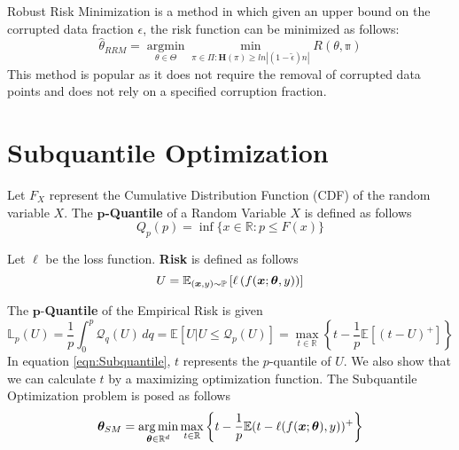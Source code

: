 \documentclass{article} %
\begin{document}
	Robust Risk Minimization \cite{RRM} is a method in which given an upper bound on the corrupted data fraction $\epsilon$, the risk function can be minimized as follows:
	\begin{equation}
		\hat{\mathbb{\theta}}_{RRM} = \operatorname*{argmin}_{\theta \in \Theta} \operatorname*{min}_{\pi \in \Pi: \mathbf{H}(\pi) \geq ln|(1-\tilde{\epsilon})n|} R(\mathbb{\theta,\pi})
	\end{equation}
	This method is popular as it does not require the removal of corrupted data points and does not rely on a specified corruption fraction.
		
	\section{Subquantile Optimization}
	\label{sec:Subquantile-optimization}
	
	\begin{definition}
		Let $F_X$ represent the Cumulative Distribution Function (CDF) of the random variable $X$. The \textbf{$\mathbf{p}$-Quantile} of a Random Variable $X$ is defined as follows \vspace{1em}
		\begin{equation}
			Q_p(p) = \inf\{x\in\mathbb{R}: p \leq F(x)\} 
		\end{equation}
	\end{definition}
	
	\begin{definition}
		Let $\ell$ be the loss function. \textbf{Risk} is defined as follows
		\begin{equation}
			U = \mathbb{E}_{({\bm{x}},y) \sim \mathbb{P}}\left[\ell \left( f({\bm{x}};{\bm{\theta}},y)\right)\right]
		\end{equation}
	\end{definition}
	The $\mathbf{p}$-\textbf{Quantile} of the Empirical Risk is given
	\begin{equation}\label{eqn:Subquantile}
		\mathbb{L}_p(U) = \frac{1}{p}\int_0^p \mathcal{Q}_q(U)\,dq = \mathbb{E}\left[U|U \leq \mathcal{Q}_p(U) \right] = \max_{t\in \mathbb{R}}\left\{t - \frac{1}{p}\mathbb{E}\left[(t-U)^+\right]\right\}
	\end{equation}
	In equation \ref{eqn:Subquantile}, $t$ represents the $p$-quantile of $U$. We also show that we can calculate $t$ by a maximizing optimization function. 
	The Subquantile Optimization problem is posed as follows
	\begin{equation}
		{\bm{\theta}}_{SM} = \operatorname*{arg\,min}_{{\bm{\theta}} \in \mathbb{R}^d} \max_{t \in \mathbb{R}} \left\{t - \frac{1}{p}\mathbb{E}(t - \ell(f({\bm{x}};{\bm{\theta}}),y))^+\right\}
	\end{equation}
	
\end{document}
